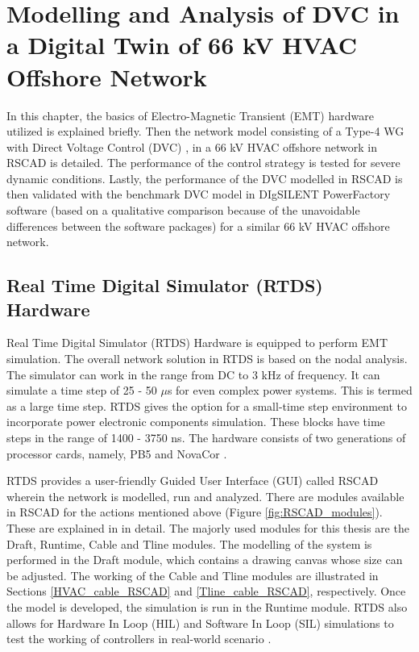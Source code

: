 \chapter{Modelling and Analysis of DVC in a Digital Twin of 66 kV HVAC Offshore Network}\label{3}

In this chapter, the basics of Electro-Magnetic Transient (\gls{EMT}) hardware utilized is explained briefly. Then the network model consisting of a Type-4 \gls{WG} with Direct Voltage Control (\gls{DVC}) \cite{korai_dynamic_2019}, \cite{sethi_real-time_nodate-new} in a 66 kV \gls{HVAC} offshore network in RSCAD is detailed. The performance of the control strategy is tested for severe dynamic conditions. Lastly, the performance of the \gls{DVC} modelled in RSCAD is then validated with the benchmark \gls{DVC} model in DIgSILENT PowerFactory software \cite{korai_98_nodate} (based on a qualitative comparison because of the unavoidable differences between the software packages) for a similar 66 kV \gls{HVAC} offshore network.

\section{Real Time Digital Simulator (RTDS) Hardware}\label{RTDS_Theory}
Real Time Digital Simulator (RTDS) Hardware is equipped to perform \gls{EMT} simulation. The overall network solution in RTDS is based on the nodal analysis. The simulator can work in the range from DC to 3 kHz of frequency. It can simulate a time step of 25 - 50 $\mu$s for even complex power systems. This is termed as a large time step. RTDS gives the option for a small-time step environment to incorporate power electronic components simulation. These blocks have time steps in the range of 1400  - 3750 ns. The hardware consists of two generations of processor cards, namely, PB5 and NovaCor \cite{rtds_tech}.  

RTDS provides a user-friendly Guided User Interface (GUI) called RSCAD wherein the network is modelled, run and analyzed. There are modules available in RSCAD for the actions mentioned above (Figure \ref{fig:RSCAD_modules}). These are explained in \cite{rtds_tech} in detail. The majorly used modules for this thesis are the Draft, Runtime, Cable and Tline modules. The modelling of the system is performed in the Draft module, which contains a drawing canvas whose size can be adjusted. The working of the Cable and Tline modules are illustrated in Sections \ref{HVAC_cable_RSCAD} and \ref{Tline_cable_RSCAD}, respectively. Once the model is developed, the simulation is run in the Runtime module. RTDS also allows for Hardware In Loop (HIL) and Software In Loop (SIL) simulations to test the working of controllers in real-world scenario \cite{rtds_tech_hardware}.


